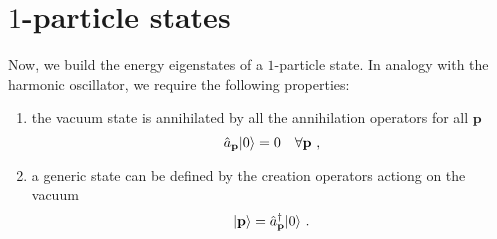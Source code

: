 \section{$1$-particle states}

    Now, we build the energy eigenstates of a $1$-particle state. In analogy with the harmonic oscillator, we require the following properties:
    \begin{enumerate}
        \item the vacuum state is annihilated by all the annihilation operators for all $\mathbf p$ 
            \begin{equation*}
                \hat a_{\mathbf p} \vert0\rangle = 0 \quad \forall \mathbf p ~,
            \end{equation*}
        \item a generic state can be defined by the creation operators actiong on the vacuum
            \begin{equation*}
                \vert\mathbf p\rangle = \hat a_{\mathbf p}^\dagger \vert0\rangle ~.
            \end{equation*}
    \end{enumerate}

